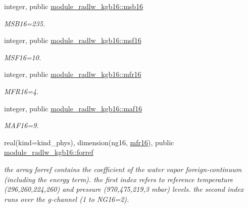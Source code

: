 \begin{DoxyCompactItemize}
\mbox{\label{group__module__radlw__kgbnn_ga18ad5b461d6c71b1aa2d82d5694beb03}} 
integer, public \hyperlink{group__module__radlw__kgbnn_ga18ad5b461d6c71b1aa2d82d5694beb03}{module\+\_\+radlw\+\_\+kgb16\+::msb16}
\begin{DoxyCompactList}\small\item\em M\+S\+B16=235. \end{DoxyCompactList}\item 
\mbox{\label{group__module__radlw__kgbnn_ga8601911604c1d6a1b32e434159ae95d2}} 
integer, public \hyperlink{group__module__radlw__kgbnn_ga8601911604c1d6a1b32e434159ae95d2}{module\+\_\+radlw\+\_\+kgb16\+::msf16}
\begin{DoxyCompactList}\small\item\em M\+S\+F16=10. \end{DoxyCompactList}\item 
\mbox{\label{group__module__radlw__kgbnn_ga82777667b951207c62955e3e1492d79d}} 
integer, public \hyperlink{group__module__radlw__kgbnn_ga82777667b951207c62955e3e1492d79d}{module\+\_\+radlw\+\_\+kgb16\+::mfr16}
\begin{DoxyCompactList}\small\item\em M\+F\+R16=4. \end{DoxyCompactList}\item 
\mbox{\label{group__module__radlw__kgbnn_gaae4c96f4a2ae49c573189f2d63ccd4a3}} 
integer, public \hyperlink{group__module__radlw__kgbnn_gaae4c96f4a2ae49c573189f2d63ccd4a3}{module\+\_\+radlw\+\_\+kgb16\+::maf16}
\begin{DoxyCompactList}\small\item\em M\+A\+F16=9. \end{DoxyCompactList}\item 
\mbox{\label{group__module__radlw__kgbnn_ga4402ed68e18459813a6c9ede5d6ba9cc}} 
real(kind=kind\+\_\+phys), dimension(ng16, \hyperlink{group__module__radlw__kgbnn_ga82777667b951207c62955e3e1492d79d}{mfr16}), public \hyperlink{group__module__radlw__kgbnn_ga4402ed68e18459813a6c9ede5d6ba9cc}{module\+\_\+radlw\+\_\+kgb16\+::forref}
\begin{DoxyCompactList}\small\item\em the array forref contains the coefficient of the water vapor foreign-\/continuum (including the energy term). the first index refers to reference temperature (296,260,224,260) and pressure (970,475,219,3 mbar) levels. the second index runs over the g-\/channel (1 to N\+G16=2). \end{DoxyCompactList}\item 

\end{DoxyCompactItemize}
